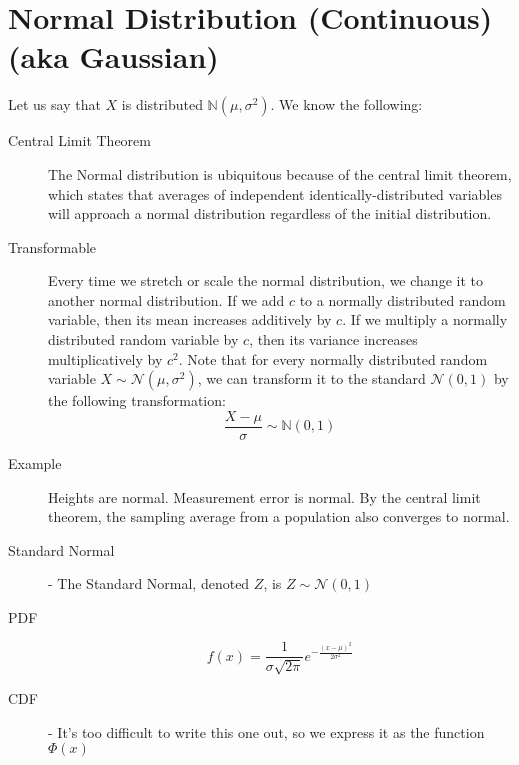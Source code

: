 \documentclass[11pt]{article}
\theoremstyle{definition}
\theoremstyle{remark}
\newcommand{\N}{\mathbb{N}}
\newcommand{\Norm}{\mathcal{N}}
\begin{document}
\section{Normal Distribution (Continuous) (aka Gaussian)}
\begin{description}

\item Let us say that $X$ is distributed $\N(\mu, \sigma^2)$. We know the following:
\begin{description}
	\item[Central Limit Theorem] The Normal distribution is ubiquitous because of the central limit theorem, which states that averages of independent identically-distributed variables will approach a normal distribution regardless of the initial distribution.
	\item[Transformable] Every time we stretch or scale the normal distribution, we change it to another normal distribution. If we add $c$ to a normally distributed random variable, then its mean increases additively by $c$. If we multiply a normally distributed random variable by $c$, then its variance increases multiplicatively by $c^2$. Note that for every normally distributed random variable $X \sim \Norm(\mu, \sigma^2)$, we can transform it to the standard $\Norm(0, 1)$ by the following transformation:
	\[\frac{X - \mu}{\sigma} \sim \N(0, 1) \]
	\item[Example] Heights are normal. Measurement error is normal. By the central limit theorem, the sampling average from a population also converges to normal.
	\item[Standard Normal] - The Standard Normal, denoted $Z$, is $Z \sim \Norm(0, 1)$
	\item[PDF]
\[ f(x)=\frac{1}{\sigma \sqrt{2\pi}} e^{-\frac{(x - \mu)^2}{2 \sigma^2}} \]
	\item[CDF] - It's too difficult to write this one out, so we express it as the function $\Phi(x)$
\end{description}
\end{description}
\end{document}
